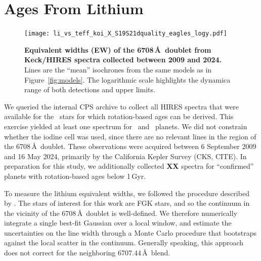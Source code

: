 \documentclass[11pt,twocolumn,tighten]{aastex63}
\begin{document}
\section{Ages From Lithium}
\label{sec:liage}

\begin{figure}[!t]
	\begin{center}
		\leavevmode
		\texttt{[image: li\_vs\_teff\_koi\_X\_S19S21dquality\_eagles\_logy.pdf]}
	\end{center}
	\vspace{-0.6cm}
	\caption{
    {\bf Equivalent widths (EW) of the  6708\,\AA\ doublet
    from Keck/HIRES spectra collected between 2009 and 2024.}
    Lines are the ``mean'' isochrones from the same models as in Figure~\ref{fig:models}.
    The logarithmic scale highlights the dynamica range of both detections
    and upper limits.
		\label{fig:li_vs_teff}
	}
\end{figure}

We queried the internal CPS archive to collect all HIRES spectra that
were available for the \nplhoststarwgyroagewithgrazingandhighruwe\
stars for which rotation-based ages can be derived.
This exercise yielded at least one spectrum for \nlithiumstars\ and 
\nlithiumplanets\ planets.
We did not constrain whether the iodine cell was used, since
there are no relevant lines in the region of the 
 6708\,\AA\ doublet.
These observations were acquired between 6 September 2009 and 16
May 2024, primarily by the California Kepler Survey (CKS,
CITE).
In preparation for this study, we additionally collected {\bf XX}
spectra for ``confirmed'' planets with rotation-based ages below
1\,Gyr.

To measure the lithium equivalent widths, we followed the procedure
described by \citet{Bouma_2021}.
The stars of interest for this work are FGK stars, and so the
continuum in the vicinity of the
 6708\,\AA\ doublet is well-defined.
We therefore numerically integrate a single best-fit Gaussian over a
local window, and estimate the uncertainties on the line width through
a Monte Carlo procedure that bootstraps against the local scatter in the
continuum.
Generally speaking, this approach does not correct for the neighboring
\ion{Fe}{1} 6707.44\,\AA\ blend.
\end{document}
